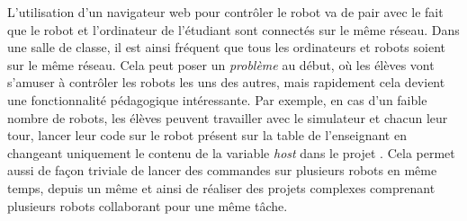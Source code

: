             L'utilisation d'un navigateur web pour contrôler le robot va de pair avec le fait que le robot et l'ordinateur de l'étudiant sont connectés sur le même réseau. Dans une salle de classe, il est ainsi fréquent que tous les ordinateurs et robots soient sur le même réseau. Cela peut poser un \textit{problème} au début, où les élèves vont s'amuser à contrôler les robots les uns des autres, mais rapidement cela devient une fonctionnalité pédagogique intéressante. Par exemple, en cas d'un faible nombre de robots, les élèves peuvent travailler avec le simulateur et chacun leur tour, lancer leur code sur le robot présent sur la table de l'enseignant en changeant uniquement le contenu de la variable \textit{host} dans le projet . Cela permet aussi de façon triviale de lancer des commandes sur plusieurs robots en même temps, depuis un même  et ainsi de réaliser des projets complexes comprenant plusieurs robots collaborant pour une même tâche.%

